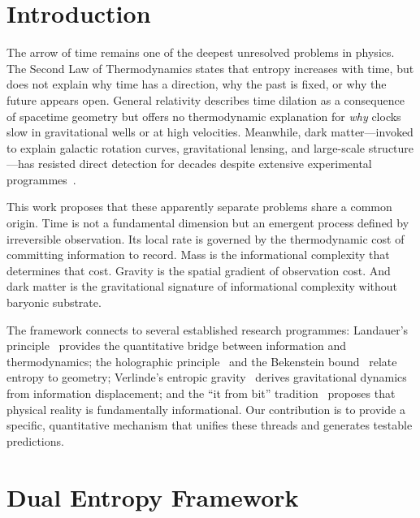 \documentclass[12pt,a4paper]{article}
\begin{document}
\tableofcontents

\section{Introduction}
\label{sec:intro}

The arrow of time remains one of the deepest unresolved problems in physics. The Second Law of Thermodynamics states that entropy increases with time, but does not explain why time has a direction, why the past is fixed, or why the future appears open. General relativity describes time dilation as a consequence of spacetime geometry but offers no thermodynamic explanation for \emph{why} clocks slow in gravitational wells or at high velocities. Meanwhile, dark matter---invoked to explain galactic rotation curves, gravitational lensing, and large-scale structure---has resisted direct detection for decades despite extensive experimental programmes~\cite{Bertone2005,Aprile2018}.

This work proposes that these apparently separate problems share a common origin. Time is not a fundamental dimension but an emergent process defined by irreversible observation. Its local rate is governed by the thermodynamic cost of committing information to record. Mass is the informational complexity that determines that cost. Gravity is the spatial gradient of observation cost. And dark matter is the gravitational signature of informational complexity without baryonic substrate.

The framework connects to several established research programmes: Landauer's principle~\cite{Landauer1961} provides the quantitative bridge between information and thermodynamics; the holographic principle~\cite{tHooft1993,Susskind1995} and the Bekenstein bound~\cite{Bekenstein1981} relate entropy to geometry; Verlinde's entropic gravity~\cite{Verlinde2011} derives gravitational dynamics from information displacement; and the ``it from bit'' tradition~\cite{Wheeler1990} proposes that physical reality is fundamentally informational. Our contribution is to provide a specific, quantitative mechanism that unifies these threads and generates testable predictions.

\section{Dual Entropy Framework}
\label{sec:dual}
\end{document}
